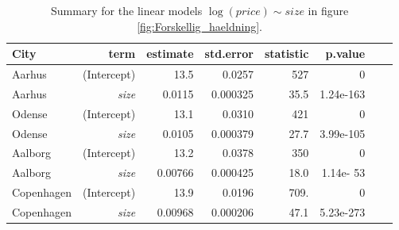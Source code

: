 \begin{table}[H]
\centering
\begin{tabular}{lrrrrrrr}
\toprule
\textbf{City}                                                                                       & \textbf{term}                & 
\textbf{estimate}            & \textbf{std.error}           & \textbf{statistic}           & \textbf{p.value}             \\
\midrule
Aarhus                                                                                & (Intercept)                  & 13.5                      & 0.0257                       & 527                         & 0                      \\
Aarhus                                                                            &  \textit{size}                   & 0.0115                       & 0.000325                         & 35.5                         & 1.24e-163                    \\
\addlinespace
Odense                                                                            &  (Intercept)                  & 13.1                     & 0.0310                       & 421                        & 0                    \\
Odense                                                                             &  \textit{size}                   & 0.0105                       & 0.000379                         & 27.7                        & 3.99e-105                    \\
\addlinespace
Aalborg                                                                           &  (Intercept)                  & 13.2                      & 0.0378                       & 350                         & 0                     \\
Aalborg                                                                            &  \textit{size}                   & 0.00766                       & 0.000425                         & 18.0                         & 1.14e- 53                    \\
\addlinespace
Copenhagen                                                                     &  (Intercept)                  & 13.9                      & 0.0196                       & 709.                        & 0                      \\
Copenhagen                                                                       &  \textit{size}                   &  0.00968                       & 0.000206                         & 47.1                        & 5.23e-273 \\                          
\bottomrule
\end{tabular}
\caption{Summary for the linear models $\log(price) \sim size$ in figure \ref{fig:Forskellig_haeldning}.}
\label{tab:my-table}
\end{table}

